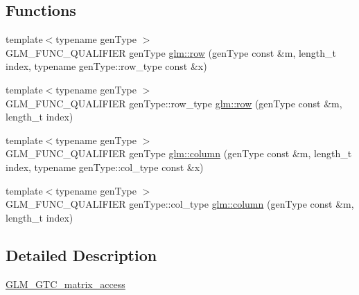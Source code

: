 \subsection*{Functions}
\begin{DoxyCompactItemize}
\item 
{\footnotesize template$<$typename gen\+Type $>$ }\\G\+L\+M\+\_\+\+F\+U\+N\+C\+\_\+\+Q\+U\+A\+L\+I\+F\+I\+ER gen\+Type \hyperlink{group__gtc__matrix__access_gaadcc64829aadf4103477679e48c7594f}{glm\+::row} (gen\+Type const \&m, length\+\_\+t index, typename gen\+Type\+::row\+\_\+type const \&x)
\item 
{\footnotesize template$<$typename gen\+Type $>$ }\\G\+L\+M\+\_\+\+F\+U\+N\+C\+\_\+\+Q\+U\+A\+L\+I\+F\+I\+ER gen\+Type\+::row\+\_\+type \hyperlink{group__gtc__matrix__access_ga259e5ebd0f31ec3f83440f8cae7f5dba}{glm\+::row} (gen\+Type const \&m, length\+\_\+t index)
\item 
{\footnotesize template$<$typename gen\+Type $>$ }\\G\+L\+M\+\_\+\+F\+U\+N\+C\+\_\+\+Q\+U\+A\+L\+I\+F\+I\+ER gen\+Type \hyperlink{group__gtc__matrix__access_ga9e757377523890e8b80c5843dbe4dd15}{glm\+::column} (gen\+Type const \&m, length\+\_\+t index, typename gen\+Type\+::col\+\_\+type const \&x)
\item 
{\footnotesize template$<$typename gen\+Type $>$ }\\G\+L\+M\+\_\+\+F\+U\+N\+C\+\_\+\+Q\+U\+A\+L\+I\+F\+I\+ER gen\+Type\+::col\+\_\+type \hyperlink{group__gtc__matrix__access_ga96022eb0d3fae39d89fc7a954e59b374}{glm\+::column} (gen\+Type const \&m, length\+\_\+t index)
\end{DoxyCompactItemize}


\subsection{Detailed Description}
\hyperlink{group__gtc__matrix__access}{G\+L\+M\+\_\+\+G\+T\+C\+\_\+matrix\+\_\+access} 